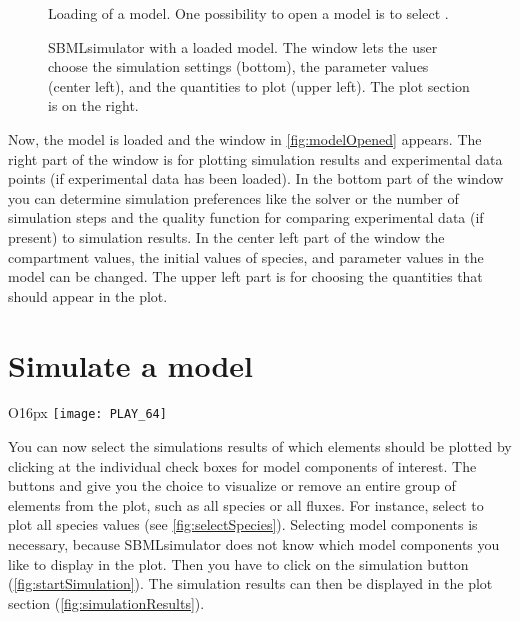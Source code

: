 \begin{figure}[t]
\centering
{}
\caption[Loading of a model]{Loading of a model.
One possibility to open a model is to select .}
\label{fig:openModel}
\end{figure}
\begin{figure}[t]
\centering
{}
\caption[SBMLsimulator with a loaded model]{SBMLsimulator with a loaded model.
The window lets the user choose the simulation settings (bottom), the parameter values (center left), and the quantities to plot (upper left).
The plot section is on the right.}
\label{fig:modelOpened}
\end{figure}
Now, the model is loaded and the window in \vref{fig:modelOpened} appears.
The right part of the window is for plotting simulation results and experimental data points (if experimental data has been loaded).
In the bottom part of the window you can determine simulation preferences like the solver or the number of simulation steps and the quality function for comparing experimental data (if present) to simulation results.
In the center left part of the window the compartment values, the initial values of species, and parameter values in the model can be changed. 
The upper left part is for choosing the quantities that should appear in the plot.

\section{Simulate a model}
\begin{wrapfigure}{O}{16px}
\vspace{\wrapfigspace}
\texttt{[image: PLAY\_64]}
\end{wrapfigure}
You can now select the simulations results of which elements should be plotted by clicking at the individual check boxes for model components of interest.
The buttons  and  give you the choice to visualize or remove an entire group of elements from the plot, such as all species or all fluxes.
For instance, select to plot all species values (see \vref{fig:selectSpecies}).
Selecting model components is necessary, because SBMLsimulator does not know which model components you like to display in the plot.
Then you have to click on the simulation button (\vref{fig:startSimulation}).
The simulation results can then be displayed in the plot section (\vref{fig:simulationResults}).

